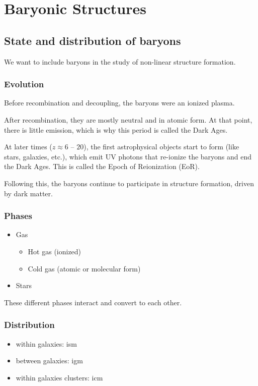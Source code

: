 \chapter{Baryonic Structures}


\section{State and distribution of baryons}


We want to include baryons in the study of non-linear structure formation.

\subsection{Evolution}
Before recombination and decoupling, the baryons were an ionized plasma.

After recombination, they are mostly neutral and in atomic form. At that point, there is little emission, which is why this period is called the Dark Ages.

At later times ($z \approx 6$ -- $20$), the first astrophysical objects start to form (like stars, galaxies, etc.), which emit UV photons that re-ionize the baryons and end the Dark Ages. This is called the Epoch of Reionization (EoR).

Following this, the baryons continue to participate in structure formation, driven by dark matter.



\subsection{Phases}

\begin{itemize}[nolistsep]
	\item Gas
	\begin{itemize}
		\item Hot gas (ionized)
		\item Cold gas (atomic or molecular form)
	\end{itemize}
	\item Stars
\end{itemize}
These different phases interact and convert to each other.



\subsection{Distribution}
\begin{itemize}
	\item within galaxies: \Ac{ism}
	\item between galaxies: \Ac{igm}
	\item within galaxies clusters: \Ac{icm}
\end{itemize}




